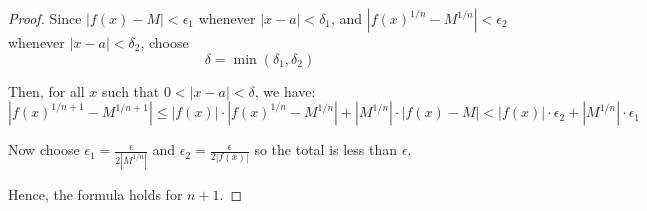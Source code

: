\documentclass{article}
\begin{document}
\begin{proof}
		Since \( |f(x) - M| < \epsilon_1 \) whenever \( |x - a| < \delta_1 \), and
		\( |f(x)^{1/n} - M^{1/n}| < \epsilon_2 \) whenever \( |x - a| < \delta_2 \),  
		choose
		\[
		\delta = \min(\delta_1, \delta_2)
		\]
		
		Then, for all \( x \) such that \( 0 < |x - a| < \delta \), we have:
		\[
		|f(x)^{1/n+1} - M^{1/n+1}| 
		\leq |f(x)| \cdot |f(x)^{1/n} - M^{1/n}| + |M^{1/n}| \cdot |f(x) - M|
		< |f(x)| \cdot \epsilon_2 + |M^{1/n}| \cdot \epsilon_1
		\]
		
		Now choose \( \epsilon_1 = \frac{\epsilon}{2|M^{1/n}|} \)  
		and \( \epsilon_2 = \frac{\epsilon}{2|f(x)|} \)  
		so the total is less than \( \epsilon \).
		
		Hence, the formula holds for \( n+1 \).
		
		
		
		
		
		
		
		
		
		
		
		
		
		
		
		
		
		
		
		
		
		
		
		
		
		
		
		
		
		
		
		
	\end{proof}
	
\end{document}

